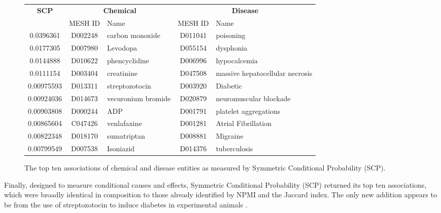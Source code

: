 \documentclass[10pt, oneside]{article}
\begin{document}
\begin{figure}[h]
\begin{center}
\fontsize{9}{11}\selectfont
\begin{tabular}{|*{2}{c|}p{4.5cm}|c|p{4.5cm}|}\hline
 \multirow{2}{*}{\textbf{SCP}} & \multicolumn{2}{c|}{\textbf{Chemical}} & \multicolumn{2}{c|}{\textbf{Disease}} \\ \cline{2-5}
 & MESH ID   & Name                      & MESH ID   & Name                         \\ \hline
 0.0396361  & D002248   & carbon monoxide    & D011041   & poisoning                       \\ \hline
 0.0177305  & D007980   & Levodopa           & D055154   & dysphonia                       \\ \hline
 0.0144888  & D010622   & phencyclidine      & D006996   & hypocalcemia                    \\ \hline
 0.0111154  & D003404   & creatinine         & D047508   & massive hepatocellular necrosis \\ \hline
 0.00975593 & D013311   & streptozotocin     & D003920   & Diabetic                        \\ \hline
 0.00924036 & D014673   & vecuronium bromide & D020879   & neuromuscular blockade          \\ \hline
 0.00903808 & D000244   & ADP                & D001791   & platelet aggregations           \\ \hline
 0.00865604 & C047426   & venlafaxine        & D001281   & Atrial Fibrillation             \\ \hline
 0.00822348 & D018170   & sumatriptan        & D008881   & Migraine                        \\ \hline
 0.00799549 & D007538   & Isoniazid          & D014376   & tuberculosis                    \\ \hline
\end{tabular}
\caption{\label{fig:scp} The top ten associations of chemical and disease entities as measured by Symmetric Conditional Probability (SCP).}
\end{center}
\end{figure}

Finally, designed to measure conditional causes and effects, Symmetric Conditional Probability (SCP) returned its top ten associations, which were broadly identical in composition to those already identified by NPMI and the Jaccard index. The only new addition appears to be from the use of streptozotocin to induce diabetes in experimental animals \cite{rossini1977studies}. 
\end{document}
